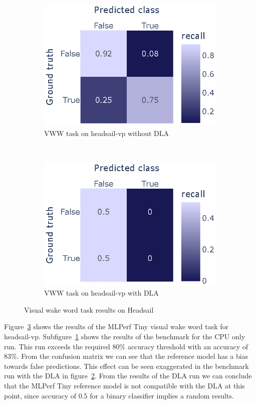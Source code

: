 \documentclass[12pt,a4paper,english
]{tunithesis}
\begin{document}
\begin{figure}
  \centering
  \begin{subfigure}[t]{0.5\textwidth}
    \includegraphics[width=\linewidth]{img/vww_200_no_acc.eps}
    \caption{VWW task on headsail-vp without DLA}
    \label{fig:vww-no-acc}
  \end{subfigure}%
  ~
  \begin{subfigure}[t]{0.5\textwidth}
    \includegraphics[width=\linewidth]{img/vww_200_acc.eps}
    \caption{VWW task on headsail-vp with DLA}
    \label{fig:vww-dla}
  \end{subfigure}%
  \caption{Visual wake word task results on Headsail}
  \label{fig:vww-results}
\end{figure}


Figure~\ref{fig:vww-results} shows the results of the MLPerf Tiny visual wake word task for headsail-vp. Subfigure~\ref{fig:vww-no-acc} shows the results of the benchmark for the CPU only run. This run exceeds the required $80\%$ accuracy threshold with an accuracy of $83\%$. From the confusion matrix we can see that the reference model has a bias towards false predictions. This effect can be seen exaggerated in the benchmark run with the DLA in figure~\ref{fig:vww-dla}. From the results of the DLA run we can conclude that the MLPerf Tiny reference model is not compatible with the DLA at this point, since accuracy of $0.5$ for a binary classifier implies a random results.
\end{document}
